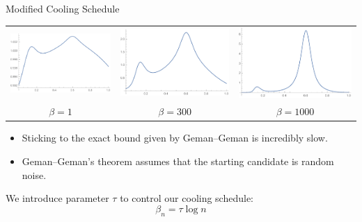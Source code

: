 \documentclass[10pt]{beamer}
\begin{document}
\begin{frame}{Modified Cooling Schedule}
\pause \begin{center}
\begin{tabular}{ccc}
\includegraphics[width=0.3\linewidth]{img/anneal-beta1} &
\includegraphics[width=0.3\linewidth]{img/anneal-beta300} &
\includegraphics[width=0.3\linewidth]{img/anneal-beta1000} \\
$\beta = 1$ & $\beta = 300$ & $\beta = 1000$
\end{tabular}
\end{center}
\begin{itemize}
\pause \item Sticking to the exact bound given by Geman--Geman is incredibly slow. 
\pause \item Geman--Geman's theorem assumes that the starting candidate is random noise.
\end{itemize}
\pause
We introduce parameter $\tau$ to control our cooling schedule:
\[ \beta_n = \tau \log n \]

\end{frame}
\end{document}
